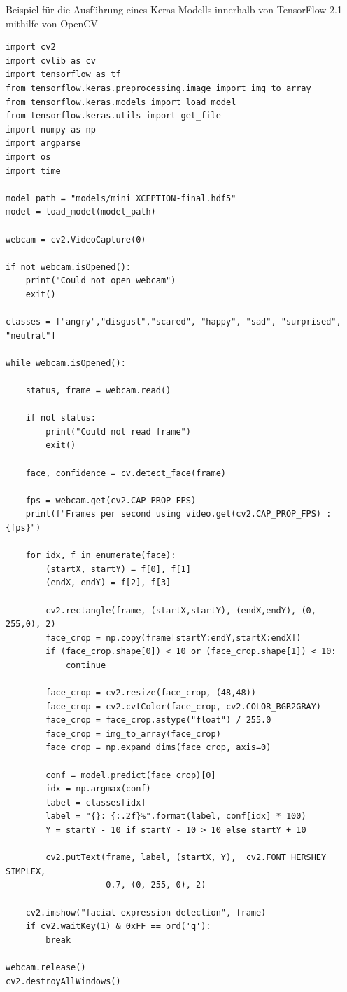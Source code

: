 Beispiel für die Ausführung eines Keras-Modells innerhalb von TensorFlow 2.1 mithilfe von OpenCV 
	
\begin{lstlisting}
import cv2
import cvlib as cv
import tensorflow as tf
from tensorflow.keras.preprocessing.image import img_to_array
from tensorflow.keras.models import load_model
from tensorflow.keras.utils import get_file
import numpy as np
import argparse
import os
import time

model_path = "models/mini_XCEPTION-final.hdf5"
model = load_model(model_path)

webcam = cv2.VideoCapture(0)

if not webcam.isOpened():
    print("Could not open webcam")
    exit()

classes = ["angry","disgust","scared", "happy", "sad", "surprised", "neutral"]

while webcam.isOpened():

    status, frame = webcam.read()

    if not status:
        print("Could not read frame")
        exit()

    face, confidence = cv.detect_face(frame)

    fps = webcam.get(cv2.CAP_PROP_FPS)
    print(f"Frames per second using video.get(cv2.CAP_PROP_FPS) : {fps}")

    for idx, f in enumerate(face):
        (startX, startY) = f[0], f[1]
        (endX, endY) = f[2], f[3]

        cv2.rectangle(frame, (startX,startY), (endX,endY), (0,  255,0), 2)
        face_crop = np.copy(frame[startY:endY,startX:endX])
        if (face_crop.shape[0]) < 10 or (face_crop.shape[1]) < 10:
            continue

        face_crop = cv2.resize(face_crop, (48,48))
        face_crop = cv2.cvtColor(face_crop, cv2.COLOR_BGR2GRAY)
        face_crop = face_crop.astype("float") / 255.0
        face_crop = img_to_array(face_crop)
        face_crop = np.expand_dims(face_crop, axis=0)

        conf = model.predict(face_crop)[0]
        idx = np.argmax(conf)
        label = classes[idx]
        label = "{}: {:.2f}%".format(label, conf[idx] * 100)
        Y = startY - 10 if startY - 10 > 10 else startY + 10

        cv2.putText(frame, label, (startX, Y),  cv2.FONT_HERSHEY_ SIMPLEX,
                    0.7, (0, 255, 0), 2)

    cv2.imshow("facial expression detection", frame)
    if cv2.waitKey(1) & 0xFF == ord('q'):
        break

webcam.release()
cv2.destroyAllWindows()
\end{lstlisting}

